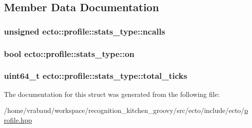 \subsection{\-Member \-Data \-Documentation}
\hypertarget{structecto_1_1profile_1_1stats__type_a570c8df89c2318ab98757e29670ba70b}{
\subsubsection[{ncalls}]{\setlength{\rightskip}{0pt plus 5cm}unsigned {\bf ecto\-::profile\-::stats\-\_\-type\-::ncalls}}}\label{structecto_1_1profile_1_1stats__type_a570c8df89c2318ab98757e29670ba70b}
\hypertarget{structecto_1_1profile_1_1stats__type_a25c84366176dc49eb9b113a4e74c6b5a}{
\subsubsection[{on}]{\setlength{\rightskip}{0pt plus 5cm}bool {\bf ecto\-::profile\-::stats\-\_\-type\-::on}}}\label{structecto_1_1profile_1_1stats__type_a25c84366176dc49eb9b113a4e74c6b5a}
\hypertarget{structecto_1_1profile_1_1stats__type_affa2973693dec71733bcf8f7b6cf9c0b}{
\subsubsection[{total\-\_\-ticks}]{\setlength{\rightskip}{0pt plus 5cm}uint64\-\_\-t {\bf ecto\-::profile\-::stats\-\_\-type\-::total\-\_\-ticks}}}\label{structecto_1_1profile_1_1stats__type_affa2973693dec71733bcf8f7b6cf9c0b}


\-The documentation for this struct was generated from the following file\-:\begin{DoxyCompactItemize}
\item 
/home/vrabaud/workspace/recognition\-\_\-kitchen\-\_\-groovy/src/ecto/include/ecto/\hyperlink{profile_8hpp}{profile.\-hpp}\end{DoxyCompactItemize}
